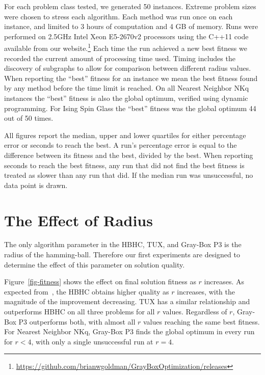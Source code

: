 For each problem class tested, we generated 50 instances.
Extreme problem sizes were chosen to stress each algorithm.
Each method was run once on each instance, and limited to 3 hours of computation and 4 GB of memory.
Runs were performed on 2.5GHz Intel Xeon E5-2670v2 processors using the C++11 code available
from our website.\footnote{\url{https://github.com/brianwgoldman/GrayBoxOptimization/releases}}
Each time the run achieved a new best fitness we recorded the current amount of processing time used.
Timing includes the discovery of subgraphs to allow for comparison between different radius values.
When reporting the ``best'' fitness for an instance we mean the best fitness found by any method before
the time limit is reached. On all Nearest Neighbor NKq instances the ``best'' fitness
is also the global optimum, verified using dynamic programming. For Ising Spin Glass the ``best'' fitness
was the global optimum 44 out of 50 times.

All figures report the median, upper and lower quartiles for either percentage error or seconds to reach the best. A run's percentage error is
equal to the difference between its fitness and the best, divided by the best. When reporting seconds
to reach the best fitness, any run that did not find the best fitness is treated as slower than any run that did.
If the median run was unsuccessful, no data point is drawn.

\section{The Effect of Radius}
\label{sec-radius}
\begin{figure*}
  \centering
  \caption{Comparison of how radius affects solution quality at termination. For NKq-Landscapes $N=6,000$ and $K=4$ and
  for Ising Spin Glasses $N=6,084$. Range of radius values limited by memory constraints.}
  \label{fig-fitness}
\end{figure*}

The only algorithm parameter in the HBHC, TUX, and Gray-Box P3
is the radius of the hamming-ball. Therefore our first experiments are designed to determine
the effect of this parameter on solution quality.

Figure~\ref{fig-fitness} shows the effect on final solution fitness as $r$ increases. As expected
from~\cite{chicano:2014:ball},
the HBHC obtains higher quality as $r$ increases, with the magnitude
of the improvement decreasing. TUX has a similar relationship and
outperforms HBHC on all three problems for all $r$ values. Regardless of $r$, Gray-Box P3 outperforms both, with almost
all $r$ values reaching the same best fitness. For Nearest Neighbor NKq, Gray-Box P3 finds the global
optimum in every run for $r < 4$, with only a single unsuccessful run at $r=4$.

